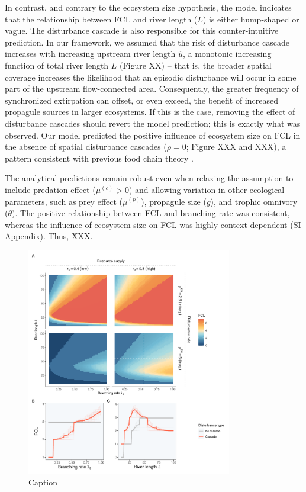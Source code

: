 \documentclass[11pt, class=article, crop=false]{standalone}
\begin{document}
In contrast, and contrary to the ecosystem size hypothesis, the model indicates that the relationship between FCL and river length ($L$) is either hump-shaped or vague.
The disturbance cascade is also responsible for this counter-intuitive prediction.
In our framework, we assumed that the risk of disturbance cascade increases with increasing upstream river length $\hat{u}$, a monotonic increasing function of total river length $L$ (Figure XX) -- that is, the broader spatial coverage increases the likelihood that an episodic disturbance will occur in some part of the upstream flow-connected area.
Consequently, the greater frequency of synchronized extirpation can offset, or even exceed, the benefit of increased propagule sources in larger ecosystems.
If this is the case, removing the effect of disturbance cascades should revert the model prediction; this is exactly what was observed. 
Our model predicted the positive influence of ecosystem size on FCL in the absence of spatial disturbance cascades ($\rho = 0$; Figure XXX and XXX), a pattern consistent with previous food chain theory \citep{holt_food_2002, takimoto_effects_2012, terui_spatial_2019, guo_towards_2023}.

The analytical predictions remain robust even when relaxing the assumption to include predation effect ($\mu^{(c)} > 0$) and allowing variation in other ecological parameters, such as prey effect ($\mu^{(p)}$), propagule size ($g$), and trophic omnivory ($\theta$).
The positive relationship between FCL and branching rate was consistent, whereas the influence of ecosystem size on FCL was highly context-dependent (SI Appendix).
Thus, XXX.

\begin{figure}
    \centering
    \includegraphics[width=0.8\textwidth]{output/fig_sim_main.pdf}
    \caption{Caption}
    \label{fig:enter-label}
\end{figure}
\end{document}
